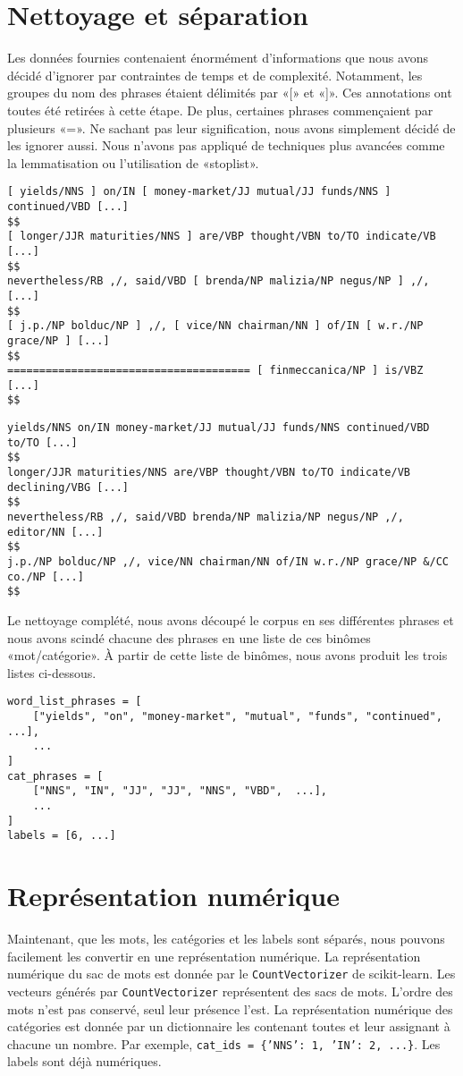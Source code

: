 \documentclass[11pt]{rapport-tp-ia}
\begin{document}
\section{Nettoyage et séparation}
Les données fournies contenaient énormément d'informations que nous avons décidé d'ignorer par contraintes de temps et de complexité.
Notamment, les groupes du nom des phrases étaient délimités par «[» et «]».
Ces annotations ont toutes été retirées à cette étape.
De plus, certaines phrases commençaient par plusieurs «=».
Ne sachant pas leur signification, nous avons simplement décidé de les ignorer aussi.
Nous n'avons pas appliqué de techniques plus avancées comme la lemmatisation ou l'utilisation de «stoplist».
\begin{lstlisting}[caption=Échantillion du corpus avant le nettoyage]
[ yields/NNS ] on/IN [ money-market/JJ mutual/JJ funds/NNS ] continued/VBD [...]
$$
[ longer/JJR maturities/NNS ] are/VBP thought/VBN to/TO indicate/VB [...]
$$
nevertheless/RB ,/, said/VBD [ brenda/NP malizia/NP negus/NP ] ,/, [...]
$$
[ j.p./NP bolduc/NP ] ,/, [ vice/NN chairman/NN ] of/IN [ w.r./NP grace/NP ] [...]
$$
====================================== [ finmeccanica/NP ] is/VBZ [...]
$$
\end{lstlisting}

\begin{lstlisting}[caption=Échantillion du corpus après le nettoyage]
yields/NNS on/IN money-market/JJ mutual/JJ funds/NNS continued/VBD to/TO [...]
$$
longer/JJR maturities/NNS are/VBP thought/VBN to/TO indicate/VB declining/VBG [...]
$$
nevertheless/RB ,/, said/VBD brenda/NP malizia/NP negus/NP ,/, editor/NN [...]
$$
j.p./NP bolduc/NP ,/, vice/NN chairman/NN of/IN w.r./NP grace/NP &/CC co./NP [...]
$$
\end{lstlisting}

Le nettoyage complété, nous avons découpé le corpus en ses différentes phrases et nous avons scindé chacune des phrases en une liste de ces binômes «mot/catégorie».
À partir de cette liste de binômes, nous avons produit les trois listes ci-dessous.

\begin{lstlisting}[caption=Les trois listes]
word_list_phrases = [
    ["yields", "on", "money-market", "mutual", "funds", "continued",  ...],
    ...
]
cat_phrases = [
    ["NNS", "IN", "JJ", "JJ", "NNS", "VBD",  ...],
    ...
]
labels = [6, ...]
\end{lstlisting}

\section{Représentation numérique}
Maintenant, que les mots, les catégories et les labels sont séparés, nous pouvons facilement les convertir en une représentation numérique.
La représentation numérique du sac de mots est donnée par le \texttt{CountVectorizer} de scikit-learn.
Les vecteurs générés par \texttt{CountVectorizer} représentent des sacs de mots. L'ordre des mots n'est pas conservé, seul leur présence l'est.
La représentation numérique des catégories est donnée par un dictionnaire les contenant toutes et leur assignant à chacune un nombre.
Par exemple, \texttt{cat\_ids = \{'NNS': 1, 'IN': 2, ...\}}.
Les labels sont déjà numériques.
\end{document}

